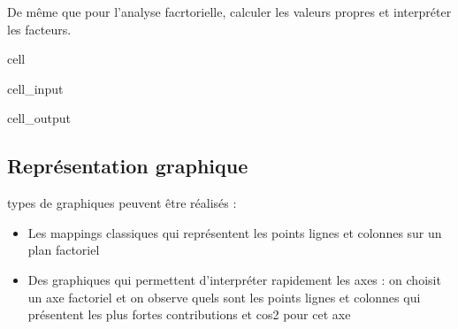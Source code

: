 \documentclass[letterpaper,10pt,french]{sphinxmanual}
\begin{document}
\sphinxAtStartPar
De même que pour l’analyse facrtorielle, calculer les valeurs propres et interpréter les facteurs.

\begin{sphinxuseclass}{cell}
\begin{sphinxuseclass}{cell_input}
\begin{sphinxVerbatim}[commandchars=\\\{\}]
\end{sphinxVerbatim}

\end{sphinxuseclass}
\begin{sphinxuseclass}{cell_output}
\noindent{}

\end{sphinxuseclass}
\end{sphinxuseclass}

\subsection{Représentation graphique}
\label{\detokenize{TP3_AFC_ACM:representation-graphique}}
 types de graphiques peuvent être réalisés :
\begin{itemize}
\item {} 
\sphinxAtStartPar
Les mappings classiques qui représentent les points lignes et colonnes sur un plan factoriel

\item {} 
\sphinxAtStartPar
Des graphiques qui permettent d’interpréter rapidement les axes : on choisit un axe factoriel et on observe quels sont les points lignes et colonnes qui présentent les plus fortes contributions et cos2 pour cet axe

\end{itemize}
\end{document}
